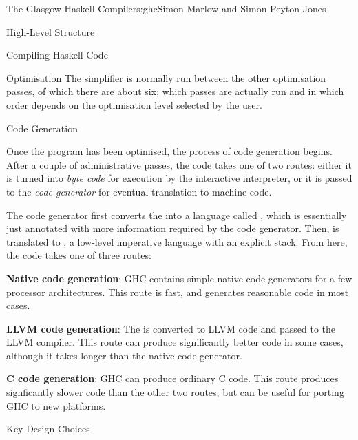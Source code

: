 \begin{aosachapter}{The Glasgow Haskell Compiler}{s:ghc}{Simon Marlow and Simon Peyton-Jones}
\begin{aosasect1}{High-Level Structure}
\begin{aosasect2}{Compiling Haskell Code}
\begin{aosasect3}{Optimisation}
The simplifier is normally run between the other optimisation passes,
of which there are about six; which passes are actually run and in
which order depends on the optimisation level selected by the user.

\end{aosasect3}

\begin{aosasect3}{Code Generation}

Once the \Core{} program has been optimised, the process of code
generation begins.  After a couple of administrative passes, the code
takes one of two routes: either it is turned into \emph{byte code} for
execution by the interactive interpreter, or it is passed to the
\emph{code generator} for eventual translation to machine code.

The code generator first converts the \Core{} into a language called
, which is essentially just \Core{} annotated with more
information required by the code generator.  Then,  is translated
to , a low-level imperative language with an explicit stack. From
here, the code takes one of three routes:

\begin{aosaitemize}

\item \textbf{Native code generation}: GHC contains simple native code
  generators for a few processor architectures.  This route is fast,
  and generates reasonable code in most cases.

\item \textbf{LLVM code generation}: The  is converted to
  LLVM code and passed to the LLVM compiler.  This route can produce
  significantly better code in some cases, although it takes longer
  than the native code generator.

\item \textbf{C code generation}: GHC can produce ordinary C code.
  This route produces signficantly slower code than the other two
  routes, but can be useful for porting GHC to new platforms.

\end{aosaitemize}

\end{aosasect3}

\end{aosasect2}

\end{aosasect1}

\begin{aosasect1}{Key Design Choices}


\end{aosasect1}
\end{aosachapter}
